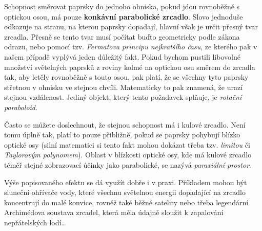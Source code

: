 \documentclass{../../../../style/mkimain}
\begin{document}
\noindent{}
\klein
Schopnost směrovat paprsky do jednoho ohniska, pokud jdou rovnoběžně s optickou osou, má pouze \textbf{konkávní parabolické zrcadlo}.
Slovo  jednoduše odkazuje na stranu, na kterou paprsky dopadají, hlavní však je určit přesný tvar zrcadla.
Přesně se tento tvar musí počítat buďto geometricky podle zákona odrazu, nebo pomocí tzv. \emph{Fermatova principu nejkratšího času},
ze kterého pak v našem případě vyplývá jeden důležitý fakt.
Pokud bychom pustili libovolné množství světelných paprsků z roviny kolmé na optickou osu směrem do zrcadla tak,
aby letěly rovnoběžně s touto osou, pak platí, že se všechny tyto paprsky střetnou v ohnisku ve stejnou chvíli.
Matematicky to pak znamená, že urazí stejnou vzdálenost. Jediný objekt, který tento požadavek splňuje, je \emph{rotační paraboloid}.

Často se můžete doslechnout, že stejnou schopnost má i kulové zrcadlo. Není tomu úplně tak, platí to pouze přibližně,
pokud se paprsky pohybují blízko optické osy (silní matematici si tento fakt mohou dokázat třeba tzv.
\emph{limitou} či \emph{Taylorovým polynomem}).
Oblast v blízkosti optické osy, kde má kulové zrcadlo téměř stejné zobrazovací účinky jako parabolické, se nazývá \emph{paraxiální prostor}.

Výše popisovaného efektu se dá využít dobře i v praxi.
Příkladem mohou být sluneční ohřívače vody, které všechnu světelnou energii dopadající na zrcadlo koncentrují do malé konvice,
rovněž také běžné satelity nebo třeba legendární Archimédova soustava zrcadel, která měla údajně sloužit k zapalování nepřátelských lodí\dots 
\end{document}
